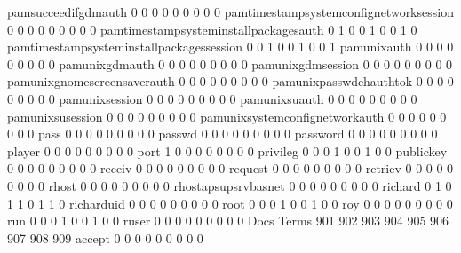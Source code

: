 \documentclass[compress,8pt]{beamer}
\begin{document}
\begin{frame}
\begin{Schunk}
  pamsucceedifgdmauth                        0   0   0   0   0   0   0   0   0
  pamtimestampsystemconfignetworksession     0   0   0   0   0   0   0   0   0
  pamtimestampsysteminstallpackagesauth      0   1   0   0   1   0   0   1   0
  pamtimestampsysteminstallpackagessession   0   0   1   0   0   1   0   0   1
  pamunixauth                                0   0   0   0   0   0   0   0   0
  pamunixgdmauth                             0   0   0   0   0   0   0   0   0
  pamunixgdmsession                          0   0   0   0   0   0   0   0   0
  pamunixgnomescreensaverauth                0   0   0   0   0   0   0   0   0
  pamunixpasswdchauthtok                     0   0   0   0   0   0   0   0   0
  pamunixsession                             0   0   0   0   0   0   0   0   0
  pamunixsuauth                              0   0   0   0   0   0   0   0   0
  pamunixsusession                           0   0   0   0   0   0   0   0   0
  pamunixsystemconfignetworkauth             0   0   0   0   0   0   0   0   0
  pass                                       0   0   0   0   0   0   0   0   0
  passwd                                     0   0   0   0   0   0   0   0   0
  password                                   0   0   0   0   0   0   0   0   0
  player                                     0   0   0   0   0   0   0   0   0
  port                                       1   0   0   0   0   0   0   0   0
  privileg                                   0   0   0   1   0   0   1   0   0
  publickey                                  0   0   0   0   0   0   0   0   0
  receiv                                     0   0   0   0   0   0   0   0   0
  request                                    0   0   0   0   0   0   0   0   0
  retriev                                    0   0   0   0   0   0   0   0   0
  rhost                                      0   0   0   0   0   0   0   0   0
  rhostapsupsrvbasnet                        0   0   0   0   0   0   0   0   0
  richard                                    0   1   0   1   1   0   1   1   0
  richarduid                                 0   0   0   0   0   0   0   0   0
  root                                       0   0   0   1   0   0   1   0   0
  roy                                        0   0   0   0   0   0   0   0   0
  run                                        0   0   0   1   0   0   1   0   0
  ruser                                      0   0   0   0   0   0   0   0   0
                                          Docs
Terms                                      901 902 903 904 905 906 907 908 909
  accept                                     0   0   0   0   0   0   0   0   0

\end{Schunk}
\end{frame}
\end{document}
